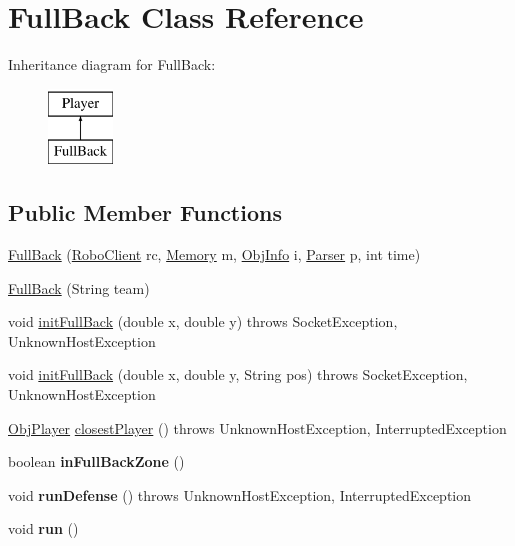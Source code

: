 \hypertarget{classFullBack}{
\section{FullBack Class Reference}
\label{classFullBack}
}
Inheritance diagram for FullBack:\begin{figure}[H]
\begin{center}
\leavevmode
\includegraphics[height=2.000000cm]{classFullBack}
\end{center}
\end{figure}
\subsection*{Public Member Functions}
\begin{DoxyCompactItemize}
\item 
\hyperlink{classFullBack_acbe24697aec4b8fdf44d3ec60a9fa40d}{FullBack} (\hyperlink{classRoboClient}{RoboClient} rc, \hyperlink{classMemory}{Memory} m, \hyperlink{classObjInfo}{ObjInfo} i, \hyperlink{classParser}{Parser} p, int time)
\item 
\hyperlink{classFullBack_a7918587f26bf13173e7065187e48e03c}{FullBack} (String team)
\item 
void \hyperlink{classFullBack_ac213422fc423c607d56d4b5710d0192e}{initFullBack} (double x, double y)  throws SocketException, UnknownHostException 
\item 
void \hyperlink{classFullBack_a4b2e2ea2db6684474a63e7c257b9c67a}{initFullBack} (double x, double y, String pos)  throws SocketException, UnknownHostException 
\item 
\hyperlink{classObjPlayer}{ObjPlayer} \hyperlink{classFullBack_afd24e3c5ff7c8b93c77069e9f86cd9ab}{closestPlayer} ()  throws UnknownHostException, InterruptedException 
\item 
\hypertarget{classFullBack_a3638f5f61bca69dc81571c1dcbfa46e7}{
boolean {\bfseries inFullBackZone} ()}
\label{classFullBack_a3638f5f61bca69dc81571c1dcbfa46e7}

\item 
\hypertarget{classFullBack_ab02ecfe8c92fdb837ed6bf6c7389cfc0}{
void {\bfseries runDefense} ()  throws UnknownHostException, InterruptedException }
\label{classFullBack_ab02ecfe8c92fdb837ed6bf6c7389cfc0}

\item 
\hypertarget{classFullBack_aef6e79bcb91ec2baebd71a601cfe94fc}{
void {\bfseries run} ()}
\label{classFullBack_aef6e79bcb91ec2baebd71a601cfe94fc}

\end{DoxyCompactItemize}


